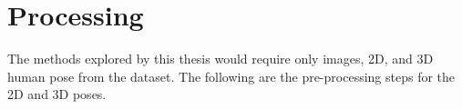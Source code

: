 






\section{Processing}

The methods explored by this thesis would require only images, 2D, and 3D human pose from the dataset. The following are the pre-processing steps for the 2D and 3D poses.



